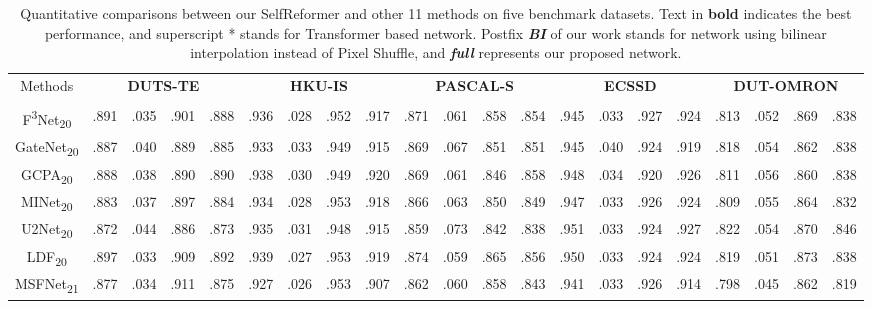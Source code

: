 \documentclass[letterpaper]{article} \usepackage{aaai22}  \usepackage{times}  \usepackage{helvet}  \usepackage{courier}  \usepackage[hyphens]{url}  \usepackage{graphicx} \urlstyle{rm} \def\UrlFont{\rm}  \usepackage{natbib}  \usepackage{caption} \DeclareCaptionStyle{ruled}{labelfont=normalfont,labelsep=colon,strut=off} \frenchspacing  \setlength{\pdfpagewidth}{8.5in}  \setlength{\pdfpageheight}{11in}  \usepackage{algorithm}
\begin{document}
\begin{table*}[!t]
\centering
\setlength\tabcolsep{2pt}
\caption{Quantitative comparisons between our SelfReformer and other 11 methods on five benchmark datasets. Text in \textbf{bold} indicates the best performance, and superscript * stands for Transformer based network. Postfix \textit{\textbf{BI}} of our work stands for network using bilinear interpolation instead of Pixel Shuffle, and \textit{\textbf{full}} represents our proposed network.}
\begin{tabular}{c|cccc|cccc|cccc|cccc|cccc} 
\hline
\hline
\multirow{2}{*}{Methods} & \multicolumn{4}{c|}{\textbf{DUTS-TE}} & \multicolumn{4}{c|}{\textbf{HKU-IS}} & \multicolumn{4}{c|}{\textbf{PASCAL-S}} & \multicolumn{4}{c|}{\textbf{ECSSD}} & \multicolumn{4}{c}{\textbf{DUT-OMRON}}  \\
                  & \textbf{} & \textbf{} & \textbf{} & \textbf{}
                  & \textbf{} & \textbf{} & \textbf{} & \textbf{}
                  & \textbf{} & \textbf{} & \textbf{} & \textbf{}
                  & \textbf{} & \textbf{} & \textbf{} & \textbf{}
                  & \textbf{} & \textbf{} & \textbf{} & \textbf{}        \\ 
\hline
\hline
F\textsuperscript{3}Net\textsubscript{20}     &.891 &.035 &.901 &.888 &.936 &.028 &.952 &.917 &.871 &.061 &.858 &.854 &.945 &.033 &.927 &.924 &.813 &.052 &.869 &.838    \\
\hline
GateNet\textsubscript{20}  &.887 &.040 &.889 &.885 &.933 &.033 &.949 &.915 &.869 &.067 &.851 &.851 &.945 &.040 &.924 &.919 &.818 &.054 &.862 &.838    \\
\hline
GCPA\textsubscript{20}      &.888 &.038 &.890 &.890 &.938 &.030 &.949 &.920 &.869 &.061 &.846 &.858 &.948 &.034 &.920 &.926 &.811 &.056 &.860 &.838    \\
\hline
MINet\textsubscript{20}     &.883 &.037 &.897 &.884 &.934 &.028 &.953 &.918 &.866 &.063 &.850 &.849 &.947 &.033 &.926 &.924 &.809 &.055 &.864 &.832    \\
\hline
U2Net\textsubscript{20}     &.872 &.044 &.886 &.873 &.935 &.031 &.948 &.915 &.859 &.073 &.842 &.838 &.951 &.033 &.924 &.927 &.822 &.054 &.870 &.846    \\
\hline
LDF\textsubscript{20}        &.897 &.033 &.909 &.892 &.939 &.027 &.953 &.919 &.874 &.059 &.865 &.856 &.950 &.033 &.924 &.924 &.819 &.051 &.873 &.838    \\
\hline
MSFNet\textsubscript{21}  &.877 &.034 &.911 &.875 &.927 &.026 &.953 &.907 &.862 &.060 &.858 &.843 &.941 &.033 &.926 &.914 &.798 &.045 &.862 &.819    \\

\end{tabular}
\end{table*}
\end{document}
